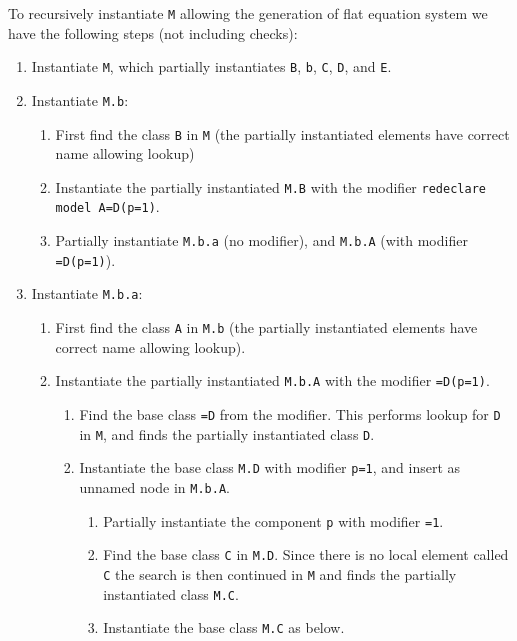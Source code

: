 \begin{example}
To recursively instantiate \lstinline!M! allowing the generation of flat equation system we have the following steps (not including checks):
\begin{enumerate}
\item
  Instantiate \lstinline!M!, which partially instantiates \lstinline!B!, \lstinline!b!, \lstinline!C!, \lstinline!D!, and \lstinline!E!.
\item
  Instantiate \lstinline!M.b!:
  \begin{enumerate}
  \item
    First find the class \lstinline!B! in \lstinline!M! (the partially instantiated elements have correct name allowing lookup)
  \item
    Instantiate the partially instantiated \lstinline!M.B! with the modifier \lstinline!redeclare model A=D(p=1)!.
  \item
    Partially instantiate \lstinline!M.b.a! (no modifier), and \lstinline!M.b.A! (with modifier \lstinline!=D(p=1)!).
  \end{enumerate}
\item
  Instantiate \lstinline!M.b.a!:
  \begin{enumerate}
  \item
    First find the class \lstinline!A! in \lstinline!M.b! (the partially instantiated elements have correct name allowing lookup).
  \item
    Instantiate the partially instantiated \lstinline!M.b.A! with the modifier \lstinline!=D(p=1)!.
    \begin{enumerate}
    \item
      Find the base class \lstinline!=D! from the modifier.
      This performs lookup for \lstinline!D! in \lstinline!M!, and finds the partially instantiated class \lstinline!D!.
    \item
      Instantiate the base class \lstinline!M.D! with modifier \lstinline!p=1!, and insert as unnamed node in \lstinline!M.b.A!.
      \begin{enumerate}
      \item
        Partially instantiate the component \lstinline!p! with modifier \lstinline!=1!.
      \item
        Find the base class \lstinline!C! in \lstinline!M.D!.
        Since there is no local element called \lstinline!C! the search is then continued in \lstinline!M! and finds the partially instantiated class \lstinline!M.C!.
      \item
        Instantiate the base class \lstinline!M.C! as below.

\end{enumerate}
\end{enumerate}
\end{enumerate}
\end{enumerate}
\end{example}
